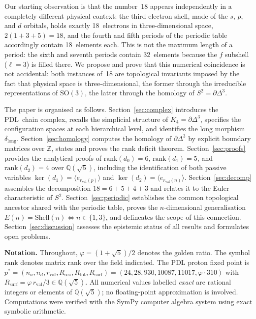 \documentclass[11pt,a4paper]{article}
\theoremstyle{definition}
\newcommand{\PDL}{\textnormal{PDL}}
\newcommand{\Rsurf}{R_{\mathrm{surf}}}
\newcommand{\Rsea}{R_{\mathrm{sea}}}
\newcommand{\Rtot}{R_{\mathrm{tot}}}
\newcommand{\rval}{r_{\mathrm{val}}}
\newcommand{\Kfour}{K_4}
\newcommand{\Sfour}{\partial\Delta^3}
\newcommand{\rank}{\mathrm{rank}}
\newcommand{\dmap}[1]{d_{#1}}
\newcommand{\dlong}{\delta_{\mathrm{long}}}
\newcommand{\vp}{\varphi}
\newcommand{\Efun}{E}
\newcommand{\Shell}{\mathrm{Shell}}
\begin{document}
Our starting observation is that the number~18 appears independently in a completely different physical context: the third electron shell, made of the $s$, $p$, and $d$ orbitals, holds exactly 18~electrons in three-dimensional space, $2(1+3+5) = 18$, and the fourth and fifth periods of the periodic table accordingly contain 18~elements each. This is not the maximum length of a period: the sixth and seventh periods contain 32~elements because the $f$ subshell ($\ell = 3$) is filled there. We propose and prove that this numerical coincidence is not accidental: both instances of~18 are topological invariants imposed by the fact that physical space is three-dimensional, the former through the irreducible representations of $\mathrm{SO}(3)$, the latter through the homology of $S^2 = \Sfour$.

The paper is organised as follows. Section~\ref{sec:complex} introduces the \PDL\ chain complex, recalls the simplicial structure of $\Kfour = \Sfour$, specifies the configuration spaces at each hierarchical level, and identifies the long morphism $\dlong$. Section~\ref{sec:homology} computes the homology of $\Sfour$ by explicit boundary matrices over $\mathbb{Z}$, states and proves the rank deficit theorem. Section~\ref{sec:proofs} provides the analytical proofs of $\rank(\dmap{0}) = 6$, $\rank(\dmap{1}) = 5$, and $\rank(\dmap{2}) = 4$ over $\mathbb{Q}(\sqrt{5})$, including the identification of both passive variables $\ker(\dmap{1}) = \langle e_{\rval(p)}\rangle$ and $\ker(\dmap{2}) = \langle e_{\rval(n)}\rangle$. Section~\ref{sec:decomp} assembles the decomposition $18 = 6+5+4+3$ and relates it to the Euler characteristic of $S^2$. Section~\ref{sec:periodic} establishes the common topological ancestor shared with the periodic table, proves the $n$-dimensional generalisation $\Efun(n) = \Shell(n) \iff n \in \{1,3\}$, and delineates the scope of this connection. Section~\ref{sec:discussion} assesses the epistemic status of all results and formulates open problems.

\medskip\noindent\textbf{Notation.} Throughout, $\vp = (1+\sqrt{5})/2$ denotes the golden ratio. The symbol $\rank$ denotes matrix rank over the field indicated. The PDL proton fixed point is $p^* = (n_u, n_d, \rval, \Rsea, \Rtot, \Rsurf) = (24, 28, 930, 10087, 11017, \vp \cdot 310)$ with $\Rsurf = \vp\,\rval/3 \in \mathbb{Q}(\sqrt{5})$. All numerical values labelled \emph{exact} are rational integers or elements of $\mathbb{Q}(\sqrt{5})$; no floating-point approximation is involved. Computations were verified with the SymPy computer algebra system using exact symbolic arithmetic.
\end{document}
